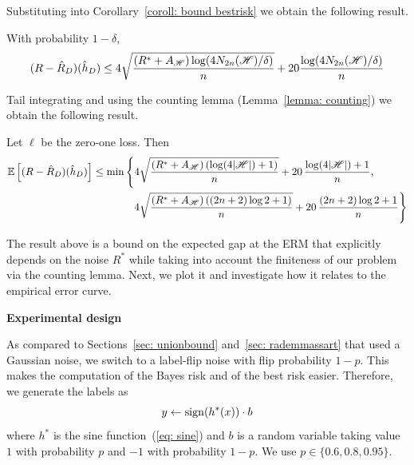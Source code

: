 \documentclass[reqno]{amsart}
\begin{document}
Substituting into Corollary~\ref{coroll: bound bestrisk} we obtain the following result.

\begin{corollary}\label{coroll: bound noiseandappr}
With probability $1-\delta$,
\[
    (R - \hat R_D)(\hat h_D) \le 4\sqrt{\frac{( R^*+A_{\mathscr{H}})\log(4N_{2n}(\mathscr{H})/\delta)}{n}} + 20\frac{\log(4N_{2n}(\mathscr{H})/\delta)}{n}
\]
\end{corollary}

Tail integrating and using the counting lemma (Lemma~\ref{lemma: counting}) we obtain the following result. 

\begin{theorem}\label{thm: bound noiseandappr}
  Let $\ell$ be the zero-one loss. Then
  \begin{equation*}
\begin{split}
\mathbb{E}\left[(R-\hat R_D)(\hat h_D)\right] \le \min\Bigg\{ &4\sqrt{\frac{(R^*+A_{\mathscr{H}})\left(\log (4\vert\mathscr{H}\vert)+1\right)}{n}} + 20\,\frac{\log(4\vert\mathscr{H}\vert)+1}{n}, \\
&4\sqrt{\frac{(R^*+A_{\mathscr{H}})\left((2n+2)\log 2+1\right)}{n}} + 20\,\frac{(2n+2)\log 2+1}{n} \Bigg\}
\end{split}
\end{equation*}
\end{theorem}

The result above is a bound on the expected gap at the ERM that explicitly depends on the noise $R^*$ while taking into account the finiteness of our problem via the counting lemma. 
Next, we plot it and investigate how it relates to the empirical error curve. 

{\bf Experimental design}

As compared to Sections~\ref{sec: unionbound} and~\ref{sec: rademmassart} that used a Gaussian noise, we switch to a label-flip noise with flip probability $1-p$. This makes the computation of the Bayes risk and of the best risk easier. Therefore, we generate the labels as 
\[
y \leftarrow \mathrm{sign}(h^*(x))\cdot b
\]
where $h^*$ is the sine function~(\ref{eq: sine}) and $b$ is a random variable taking value $1$ with probability $p$ and $-1$ with probability $1-p$. We use $p\in\{0.6,0.8,0.95\}$.
\end{document}
